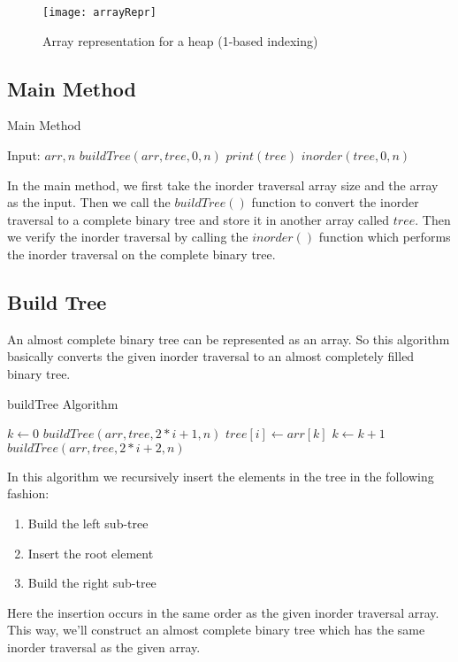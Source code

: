 \documentclass[letterpaper, 12 pt, conference]{ieeeconf}  %
\begin{document}
\begin{figure}[H]
\texttt{[image: arrayRepr]}
\caption{Array representation for a heap (1-based indexing)}
\end{figure}

\subsection{Main Method}
\begin{algorithm}[H]
\caption{Main Method}\label{alg:main}
\begin{algorithmic}
\State Input: $arr, n$
\State $buildTree(arr, tree, 0, n)$
\State $print(tree)$
\State $inorder(tree, 0, n)$
\EndProcedure
\end{algorithmic}
\end{algorithm}
In the main method, we first take the inorder traversal array size and the array as the input. Then we call the $buildTree()$ function to convert the inorder traversal to a complete binary tree and store it in another array called $tree$. Then we verify the inorder traversal by calling the $inorder()$ function which performs the inorder traversal on the complete binary tree.

\subsection{Build Tree}
An almost complete binary tree can be represented as an array. So this algorithm basically converts the given inorder traversal to an almost completely filled binary tree.
\begin{algorithm}[H]
\caption{buildTree Algorithm}\label{alg:buildTree}
\begin{algorithmic}
\State $k \gets 0$
  \State $buildTree(arr, tree, 2*i + 1, n)$
  \State $tree[i] \gets arr[k]$
  \State $k \gets k + 1$
  \State $buildTree(arr, tree, 2*i + 2, n)$
\EndIf
\EndProcedure
\end{algorithmic}
\end{algorithm}
In this algorithm we recursively insert the elements in the tree in the following fashion:
\begin{enumerate}
\item Build the left sub-tree
\item Insert the root element
\item Build the right sub-tree
\end{enumerate}
Here the insertion occurs in the same order as the given inorder traversal array. This way, we'll construct an almost complete binary tree which has the same inorder traversal as the given array.
\end{document}
